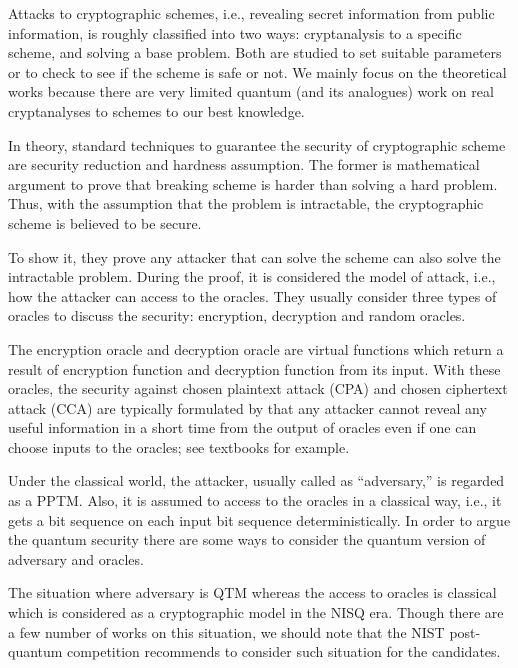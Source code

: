 Attacks to cryptographic schemes, i.e., revealing secret information from public information, is roughly classified into two ways: cryptanalysis to a specific scheme, and solving a base problem.
Both are studied to set suitable parameters or to check to see if the scheme is safe or not.
We mainly focus on the theoretical works
because there are very limited quantum (and its analogues) work \cite{LBC+12,War19,BPF+19} on real cryptanalyses to schemes to our best knowledge.

In theory, standard techniques to guarantee the security of cryptographic scheme 
are security reduction and hardness assumption.
The former is mathematical argument to prove that breaking scheme is harder than solving a hard problem.
Thus, with the assumption that the problem is intractable, 
the cryptographic scheme is believed to be secure.

To show it, they prove any attacker that can solve the scheme can also solve the intractable problem.
During the proof, it is considered the model of attack, i.e., how the attacker can access to the oracles.
They usually consider three types of oracles to discuss the security:  
encryption, decryption and random oracles.

The encryption oracle and decryption oracle are virtual functions which return
a result of encryption function and decryption function from its input.
With these oracles, the security against chosen plaintext attack (CPA) \cite{GM84}
and chosen ciphertext attack (CCA) \cite{NY90,DDN91} are typically 
formulated by that any attacker cannot reveal any useful information in a short time from the output of oracles even if one can choose inputs to the oracles; see textbooks \cite{Gol06book,Gol09book} for example.

Under the classical world, the attacker, usually called as ``adversary,'' is regarded as a PPTM.
Also, it is assumed to access to the oracles in a classical way,
i.e., it gets a bit sequence on each input bit sequence deterministically.
In order to argue the quantum security there are some ways to consider the quantum version of adversary and oracles.

The situation where adversary is QTM whereas the access to oracles is classical which is considered as a cryptographic model in the NISQ era.
Though there are a few number of works \cite{BHN+19} on this situation, 
we should note that the NIST post-quantum competition 
recommends to consider such situation \cite{NISTpqcriteria} for the candidates.

